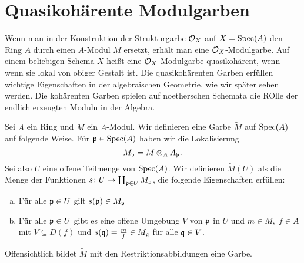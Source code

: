 
\chapter{Quasikohärente Modulgarben}
\label{chap:9}

Wenn man in der Konstruktion der Strukturgarbe $\mathcal{O}_X$ auf $X = \operatorname{Spec}(A)$ den Ring $A$ durch einen $A$-Modul $M$ ersetzt, erhält man eine $\mathcal{O}_X$-Modulgarbe. Auf einem beliebigen Schema $X$ heißt eine $\mathcal{O}_X$-Modulgarbe quasikohärent, wenn wenn sie lokal von obiger Gestalt ist. Die quasikohärenten Garben erfüllen wichtige Eigenschaften in der algebraischen Geometrie, wie wir später sehen werden. Die kohärenten Garben spielen auf noetherschen Schemata die ROlle der endlich erzeugten Moduln in der Algebra.

\begin{kons}
\label{kons:9.1}
	Sei $A$ ein Ring und $M$ ein $A$-Modul. Wir definieren eine Garbe $\widetilde{M}$ auf $\operatorname{Spec}(A)$ auf folgende Weise. Für $\mathfrak{p} \in \operatorname{Spec}(A)$ haben wir die Lokalisierung
	\[
		M_{\mathfrak{p}} = M \otimes_A A_{\mathfrak{p}}.
	\]
	Sei also $U$ eine offene Teilmenge von $\operatorname{Spec}(A)$. Wir definieren $\widetilde{M}(U)$ als die Menge der Funktionen $s \colon U \to \coprod_{\mathfrak{p} \in U} M_{\mathfrak{p}}$, die folgende Eigenschaften erfüllen:
	\begin{enumerate}[a)]
		\item Für alle $\mathfrak{p} \in U$ gilt $s(\mathfrak{p}) \in M_{\mathfrak{p}}$
		\item Für alle $\mathfrak{p} \in U$ gibt es eine offene Umgebung $V$ von $\mathfrak{p}$ in $U$ und $m\in M,\;f\in A$ mit $V \subseteq D(f)$ und $s(\mathfrak{q}) = \frac{m}{f} \in M_{\mathfrak{q}}$ für alle $\mathfrak{q} \in V$.
	\end{enumerate}
	Offensichtlich bildet $\widetilde{M}$ mit den Restriktionsabbildungen eine Garbe.
\end{kons}

